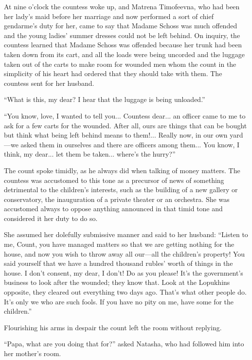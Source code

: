 At nine o'clock the countess woke up, and Matrena Timofeevna, who
had been her lady's maid before her marriage and now performed a
sort of chief gendarme's duty for her, came to say that Madame
Schoss was much offended and the young ladies' summer dresses
could not be left behind.  On inquiry, the countess learned that
Madame Schoss was offended because her trunk had been taken down
from its cart, and all the loads were being uncorded and the
luggage taken out of the carts to make room for wounded men whom
the count in the simplicity of his heart had ordered that they
should take with them. The countess sent for her husband.

``What is this, my dear? I hear that the luggage is being
unloaded.''

``You know, love, I wanted to tell you... Countess dear... an
officer came to me to ask for a few carts for the wounded. After
all, ours are things that can be bought but think what being left
behind means to them!... Really now, in our own yard---we asked
them in ourselves and there are officers among them... You know,
I think, my dear... let them be taken... where's the hurry?''

The count spoke timidly, as he always did when talking of money
matters.  The countess was accustomed to this tone as a precursor
of news of something detrimental to the children's interests,
such as the building of a new gallery or conservatory, the
inauguration of a private theater or an orchestra. She was
accustomed always to oppose anything announced in that timid tone
and considered it her duty to do so.

She assumed her dolefully submissive manner and said to her
husband: ``Listen to me, Count, you have managed matters so that
we are getting nothing for the house, and now you wish to throw
away all our---all the children's property! You said yourself
that we have a hundred thousand rubles' worth of things in the
house. I don't consent, my dear, I don't!  Do as you please! It's
the government's business to look after the wounded; they know
that. Look at the Lopukhins opposite, they cleared out everything
two days ago. That's what other people do. It's only we who are
such fools. If you have no pity on me, have some for the
children.''

Flourishing his arms in despair the count left the room without
replying.

``Papa, what are you doing that for?'' asked Natasha, who had
followed him into her mother's room.

